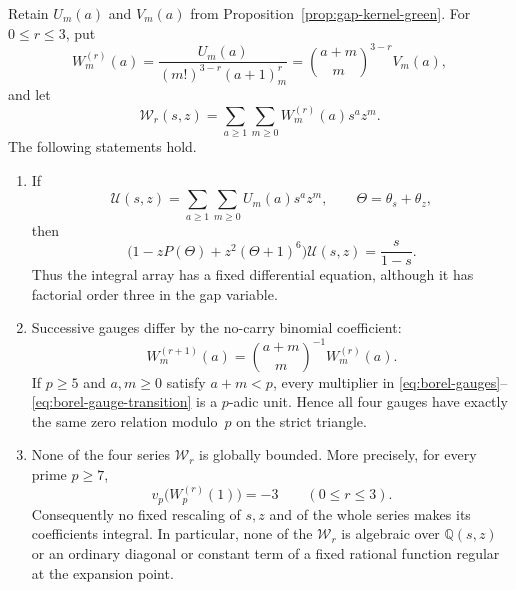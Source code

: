 \begin{proposition}
\label{prop:gap-kernel-borel-gauges}
Retain $U_m(a)$ and $V_m(a)$ from
Proposition~\ref{prop:gap-kernel-green}.  For $0\leq r\leq3$, put
\begin{equation}
 W_m^{(r)}(a)
 =\frac{U_m(a)}{(m!)^{3-r}(a+1)_m^r}
 =\binom{a+m}{m}^{3-r}V_m(a),
 \label{eq:borel-gauges}
\end{equation}
and let
\[
 \mathcal W_r(s,z)=
 \sum_{a\geq1}\sum_{m\geq0}W_m^{(r)}(a)s^az^m.
\]
The following statements hold.

\begin{enumerate}
\item If
  \[
   \mathcal U(s,z)=\sum_{a\geq1}\sum_{m\geq0}U_m(a)s^az^m,
   \qquad \Theta=\theta_s+\theta_z,
  \]
  then
  \begin{equation}
   \boxed{
   \bigl(1-zP(\Theta)+z^2(\Theta+1)^6\bigr)\mathcal U(s,z)
   =\frac{s}{1-s}.}
   \label{eq:unnormalized-bivariate-PDE}
  \end{equation}
  Thus the integral array has a fixed differential equation, although it
  has factorial order three in the gap variable.

\item Successive gauges differ by the no-carry binomial coefficient:
  \begin{equation}
   W_m^{(r+1)}(a)=\binom{a+m}{m}^{-1}W_m^{(r)}(a).
   \label{eq:borel-gauge-transition}
  \end{equation}
  If $p\geq5$ and $a,m\geq0$ satisfy $a+m<p$, every multiplier in
  \eqref{eq:borel-gauges}--\eqref{eq:borel-gauge-transition} is a
  $p$-adic unit.  Hence all four gauges have exactly the same zero relation
  modulo~$p$ on the strict triangle.

\item None of the four series $\mathcal W_r$ is globally bounded.  More
  precisely, for every prime $p\geq7$,
  \begin{equation}
   v_p\bigl(W_p^{(r)}(1)\bigr)=-3
   \qquad(0\leq r\leq3).
   \label{eq:borel-gauge-denominator}
  \end{equation}
  Consequently no fixed rescaling of $s,z$ and of the whole series makes
  its coefficients integral.  In particular, none of the $\mathcal W_r$
  is algebraic over $\mathbb Q(s,z)$ or an ordinary diagonal or constant
  term of a fixed rational function regular at the expansion point.


\end{enumerate}
\end{proposition}
